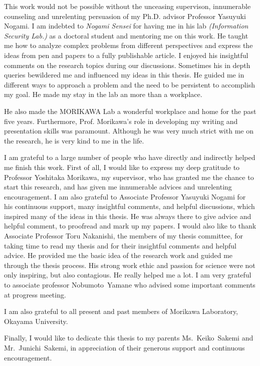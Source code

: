 This work would not be possible without the unceasing supervison, innumerable counseling and unrelenting persuasion of my Ph.D. advisor Professor Yasuyuki Nogami.
I am indebted to \textit{Nogami Sensei} for having me in his lab \textit{(Information Security Lab.)} as a doctoral student and mentoring me on this work.
He taught me how to analyze complex problems from different perspectives and express the ideas from pen and papers to a fully publishable article.
I enjoyed his insightful comments on the research topics during our discussions.
Sometimes his in depth queries bewildered me and influenced my ideas in this thesis.
He guided me  in different ways to approach a problem and the need to be persistent to accomplish my goal. 
He made my stay in the lab an more than a workplace. 

He also made the MORIKAWA Lab a wonderful workplace and home for the past five years. Furthermore, Prof. Morikawa's role in developing my writing and presentation skills was paramount.
Although he was very much strict with me on the research, he is very kind to me in the life. 


I am grateful to a large number of people who have directly and indirectly helped me finish this work.
First of all, I would like to express my deep gratitude to Professor Yoshitaka Morikawa, my supervisor, who has granted me the chance to start this research, and has given me innumerable advices and unrelenting encouragement.
I am also grateful to Associate Professor Yasuyuki Nogami for his continuous support, many insightful comments, and helpful discussions, which inspired many of the ideas in this thesis.  He was always there to give advice and helpful comment, to proofread and mark up my papers. 
I would also like to thank Associate Professor Toru Nakanishi, the members of my thesis committee,  for taking time to read my thesis and for their insightful comments and helpful advice. He provided me the basic idea of the research work and guided me through the thesis process. His strong work ethic and passion for science were not only inspiring, but also contagious. He really helped me a lot. 
I am very grateful to associate professor \mbox{Nobumoto Yamane} who advised some important comments at progress meeting.

I am also grateful to all present and past members of Morikawa Laboratory, Okayama University.

Finally, I would like to dedicate this thesis to my parents \mbox{Ms. Keiko Sakemi} and \mbox{Mr. Junichi Sakemi}, in appreciation of their generous support and continuous encouragement. 





